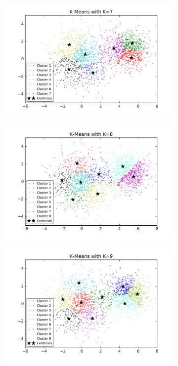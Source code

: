 \begin{description}
\begin{figure}[htb]
\begin{subfigure}[b]{0.475\textwidth}
            \includegraphics[width=\textwidth]{./figures/clustering_kMeans_7.png}
        \end{subfigure}
        \hfill
        \begin{subfigure}[b]{0.475\textwidth}  
            \centering 
            \includegraphics[width=\textwidth]{./figures/clustering_kMeans_8.png}
        \end{subfigure}
        \begin{subfigure}[b]{0.475\textwidth}   
            \centering 
            \includegraphics[width=\textwidth]{./figures/clustering_kMeans_9.png}

\end{subfigure}
\end{figure}
\end{description}
